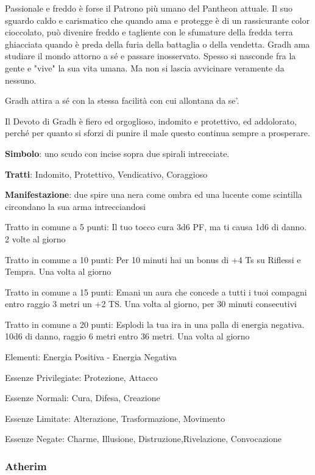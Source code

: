 \documentclass[a4paper,11pt,twoside,openany]{book}
\begin{document}
Passionale e freddo è forse il Patrono più umano del Pantheon attuale. Il suo sguardo caldo e carismatico che quando ama e protegge è di un rassicurante color cioccolato, può divenire freddo e tagliente con le sfumature della fredda terra ghiacciata quando è preda della furia della battaglia o della vendetta. Gradh ama studiare il mondo attorno a sé e passare inosservato. Spesso si nasconde fra la gente e "vive" la sua vita umana. Ma non si lascia avvicinare veramente da nessuno.

Gradh attira a sé con la stessa facilità con cui allontana da se'.

Il Devoto di Gradh è fiero ed orgoglioso, indomito e protettivo, ed addolorato, perché per quanto si sforzi di punire il male questo continua sempre a prosperare.

\textbf{Simbolo}: uno scudo con incise sopra due spirali intrecciate.

\textbf{Tratti}: Indomito, Protettivo, Vendicativo, Coraggioso

\textbf{Manifestazione}: due spire una nera come ombra ed una lucente come scintilla circondano la sua arma intrecciandosi

\bigskip

Tratto in comune a 5 punti: Il tuo tocco cura 3d6 PF, ma ti causa 1d6 di danno. 2 volte al giorno

Tratto in comune a 10 punti: Per 10 minuti hai un bonus di +4 Ts su Riflessi e Tempra. Una volta al giorno

Tratto in comune a 15 punti: Emani un aura che concede a tutti i tuoi compagni entro raggio 3 metri un +2 TS. Una volta al giorno, per 30 minuti consecutivi

Tratto in comune a 20 punti: Esplodi la tua ira in una palla di energia negativa. 10d6 di danno, raggio 6 metri entro 36 metri. Una volta al giorno

\bigskip

Elementi: Energia Positiva - Energia Negativa

\bigskip

Essenze Privilegiate: Protezione, Attacco

Essenze Normali: Cura, Difesa, Creazione

Essenze Limitate: Alterazione, Trasformazione, Movimento

Essenze Negate: Charme, Illusione, Distruzione,Rivelazione, Convocazione

\subsubsection{Atherim}
\end{document}
